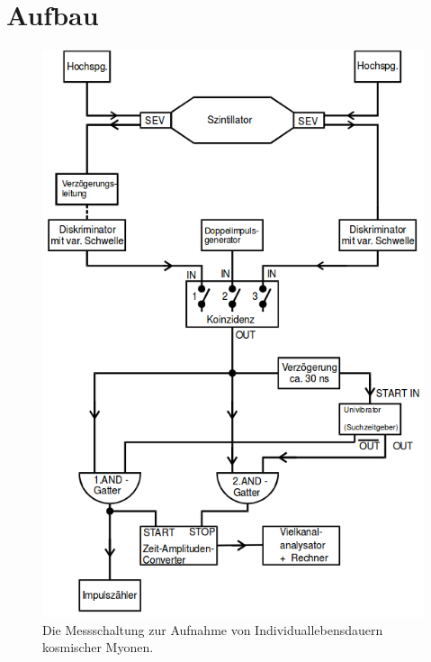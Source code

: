 \section{Aufbau}
\label{sec:Aufbau}
\begin{figure}
    \centering
    \includegraphics[width=\textwidth]{content/images/AufbauV01.png}
    \caption{Die Messschaltung zur Aufnahme von Individuallebensdauern kosmischer Myonen.}
    \label{fig:Aufbau}
    \end{figure}

